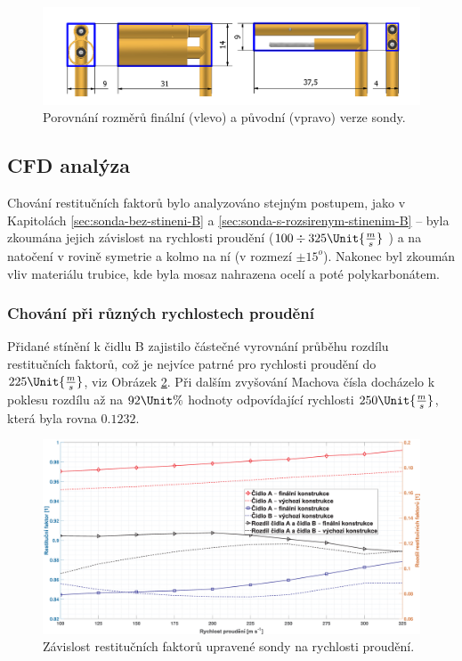         

        \begin{figure}[ht!]
            \centering
            \includegraphics[width=\textwidth]{500_FINAL/porovnani_v01_final.png}
            \caption{Porovnání rozměrů finální (vlevo) a původní (vpravo) verze sondy.}
            \label{fig:sonda-final-porovnani}
        \end{figure}
        
    \subsection{CFD analýza}
        Chování restitučních faktorů bylo analyzováno stejným postupem, jako v Kapitolách \ref{sec:sonda-bez-stineni-B} a \ref{sec:sonda-s-rozsirenym-stinenim-B} – byla zkoumána jejich závislost na rychlosti proudění ($100 \div 325 \Unit{\frac{m}{s}}$ ) a na natočení v rovině symetrie a kolmo na ní (v rozmezí $\pm 15^o$). Nakonec byl zkoumán vliv materiálu trubice, kde byla mosaz nahrazena ocelí a poté polykarbonátem.
        \subsubsection{Chování při různých rychlostech proudění}
            Přidané stínění k čidlu B zajistilo částečné vyrovnání průběhu rozdílu restitučních faktorů, což je nejvíce patrné pro rychlosti proudění do $225 \Unit{\frac{m}{s}}$, viz Obrázek \ref{fig:sonda-final-rychlosti}. Při dalším zvyšování Machova čísla docházelo k poklesu rozdílu až na $92 \Unit{\%}$ hodnoty odpovídající rychlosti $250 \Unit{\frac{m}{s}}$, která byla rovna $0.1232$. 
            \begin{figure}[ht!]
                \centering
                \includegraphics*[width=\textwidth]{500_FINAL/final_rychlosti.eps}
                \caption{Závislost restitučních faktorů upravené sondy na rychlosti proudění.}
                \label{fig:sonda-final-rychlosti}
            \end{figure}

